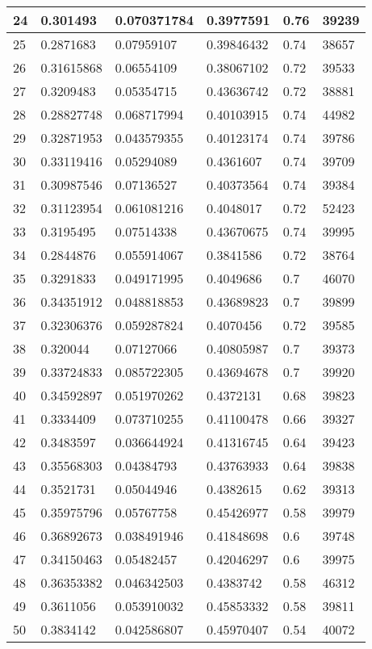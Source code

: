 \begin{longtable}{|l|l|l|l|l|l|}
24 & 0.301493 & 0.070371784 & 0.3977591 & 0.76 & 39239 \\ \hline 
25 & 0.2871683 & 0.07959107 & 0.39846432 & 0.74 & 38657 \\ \hline 
26 & 0.31615868 & 0.06554109 & 0.38067102 & 0.72 & 39533 \\ \hline 
27 & 0.3209483 & 0.05354715 & 0.43636742 & 0.72 & 38881 \\ \hline 
28 & 0.28827748 & 0.068717994 & 0.40103915 & 0.74 & 44982 \\ \hline 
29 & 0.32871953 & 0.043579355 & 0.40123174 & 0.74 & 39786 \\ \hline 
30 & 0.33119416 & 0.05294089 & 0.4361607 & 0.74 & 39709 \\ \hline 
31 & 0.30987546 & 0.07136527 & 0.40373564 & 0.74 & 39384 \\ \hline 
32 & 0.31123954 & 0.061081216 & 0.4048017 & 0.72 & 52423 \\ \hline 
33 & 0.3195495 & 0.07514338 & 0.43670675 & 0.74 & 39995 \\ \hline 
34 & 0.2844876 & 0.055914067 & 0.3841586 & 0.72 & 38764 \\ \hline 
35 & 0.3291833 & 0.049171995 & 0.4049686 & 0.7 & 46070 \\ \hline 
36 & 0.34351912 & 0.048818853 & 0.43689823 & 0.7 & 39899 \\ \hline 
37 & 0.32306376 & 0.059287824 & 0.4070456 & 0.72 & 39585 \\ \hline 
38 & 0.320044 & 0.07127066 & 0.40805987 & 0.7 & 39373 \\ \hline 
39 & 0.33724833 & 0.085722305 & 0.43694678 & 0.7 & 39920 \\ \hline 
40 & 0.34592897 & 0.051970262 & 0.4372131 & 0.68 & 39823 \\ \hline 
41 & 0.3334409 & 0.073710255 & 0.41100478 & 0.66 & 39327 \\ \hline 
42 & 0.3483597 & 0.036644924 & 0.41316745 & 0.64 & 39423 \\ \hline 
43 & 0.35568303 & 0.04384793 & 0.43763933 & 0.64 & 39838 \\ \hline 
44 & 0.3521731 & 0.05044946 & 0.4382615 & 0.62 & 39313 \\ \hline 
45 & 0.35975796 & 0.05767758 & 0.45426977 & 0.58 & 39979 \\ \hline 
46 & 0.36892673 & 0.038491946 & 0.41848698 & 0.6 & 39748 \\ \hline 
47 & 0.34150463 & 0.05482457 & 0.42046297 & 0.6 & 39975 \\ \hline 
48 & 0.36353382 & 0.046342503 & 0.4383742 & 0.58 & 46312 \\ \hline 
49 & 0.3611056 & 0.053910032 & 0.45853332 & 0.58 & 39811 \\ \hline 
50 & 0.3834142 & 0.042586807 & 0.45970407 & 0.54 & 40072 \\ \hline 
\end{longtable}
